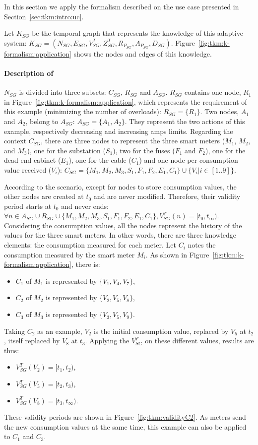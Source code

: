 In this section we apply the formalism described on the use case presented in Section~\ref{sec:tkm:intro:uc}.

Let $K_{SG}$ be the temporal graph that represents the knowledge of this adaptive system: $K_{SG} = (N_{SG}, E_{SG}, V^T_{SG}, Z^T_{SG}, R_{P_{SG}}, A_{P_{SG}}, D_{SG})$.
Figure~\ref{fig:tkm:k-formalism:application} shows the nodes and edges of this knowledge.

\paragraph{Description of }
$N_{SG}$ is divided into three subsets: $C_{SG}$, $R_{SG}$ and $A_{SG}$.
$R_{SG}$ contains one node, $R_1$ in Figure~\ref{fig:tkm:k-formalism:application}, which represents the requirement of this example (minimizing the number of overloads): $R_{SG} = \{R_1\}$.
Two nodes, $A_1$ and $A_2$, belong to $A_{SG}$: $A_{SG} = \{ A_1, A_2\}$.
They represent the two actions of this example, respectively decreasing and increasing amps limits.
Regarding the context $C_{SG}$, there are three nodes to represent the three smart meters ($M_1$, $M_2$, and $M_3$), one for the substation ($S_1$), two for the fuses ($F_1$ and $F_2$), one for the dead-end cabinet ($E_1$), one for the cable ($C_1$) and one node per consumption value received ($V_i$): $C_{SG} = \{M_1, M_2, M_3, S_1, F_1, F_2, E_1, C_1 \} \cup \{ V_i | i \in [1..9]\}$.

According to the scenario, except for nodes to store consumption values, the other nodes are created at $t_0$ and are never modified.
Therefore, their validity period starts at $t_0$ and never ends: $\forall n \in A_{SG} \cup R_{SG} \cup \{M_1, M_2, M_3, S_1, F_1, F_2, E_1, C_1\}, V^T_{SG}(n) = [t_0, t_\infty)$.
Considering the consumption values, all the nodes represent the history of the values for the three smart meters.
In other words, there are three knowledge elements: the consumption measured for each meter.
Let $C_i$ notes the consumption measured by the smart meter $M_i$.
As shown in Figure~\ref{fig:tkm:k-formalism:application}, there is:
\begin{itemize}
	\item $C_1$ of $M_1$ is represented by $\{V_1, V_4, V_7\}$,
	\item $C_2$ of $M_2$ is represented by $\{V_2, V_5, V_8\}$,
	\item $C_3$ of $M_3$ is represented by $\{V_3, V_5, V_9\}$.
\end{itemize}
Taking $C_2$ as an example, $V_2$ is the initial consumption value, replaced by $V_5$ at $t_2$, itself replaced by $V_8$ at $t_3$. 
Applying the $V_{SG}^T$ on these different values, results are thus:
\begin{itemize}
	\item $V_{SG}^T(V_2) = [t_1, t_2)$,
	\item $V_{SG}^T(V_5) = [t_2, t_3)$,
	\item $V_{SG}^T(V_8) = [t_3, t_\infty)$.
\end{itemize}
These validity periods are shown in Figure~\ref{fig:tkm:validityC2}.
As meters send the new consumption values at the same time, this example can also be applied to $C_1$ and $C_3$.

